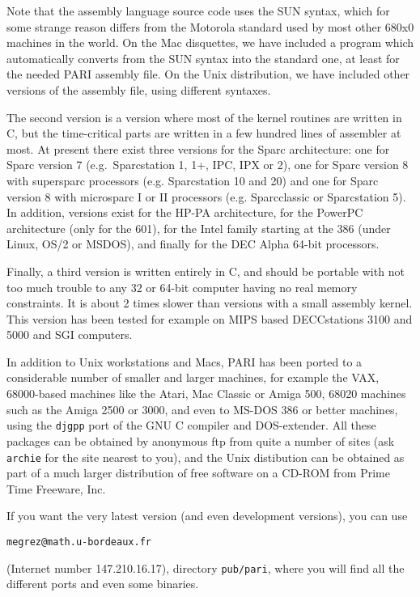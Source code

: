Note that the assembly language source code uses the SUN syntax,
which for some strange reason differs from the Motorola standard used by
most other 680x0 machines in the world. On the Mac disquettes, we have
included a program which automatically converts
from the SUN syntax into the standard one, at least for the needed PARI
assembly file. On the Unix distribution, we have included other versions
of the assembly file, using different syntaxes. 

The second version is a version where most of the kernel routines are written
in C, but the time-critical parts are written in a few hundred lines
of assembler at most. At present there exist three versions for the Sparc 
architecture: one for Sparc version 7 (e.g.~Sparcstation 1, 1+, IPC, IPX or 2),
one for Sparc version 8 with supersparc processors (e.g. Sparcstation 10
and 20) and one for Sparc version 8 with microsparc I or II processors
(e.g. Sparcclassic or Sparcstation 5). In addition, versions exist for
the HP-PA architecture, for the PowerPC architecture (only for the 601),
for the Intel family starting at the 386 (under Linux, OS/2 or MSDOS), and
finally for the DEC Alpha 64-bit processors.

Finally, a third version is written entirely in C, and should be portable with
not too much trouble to any 32 or 64-bit computer having no real memory
constraints. It is about 2 times slower than versions with a small assembly
kernel. This version has been tested for example on MIPS based DECCstations 
3100 and 5000 and SGI computers. 

In addition to Unix workstations and Macs, PARI has been ported to a 
considerable number of smaller and larger machines, for example the VAX,
68000-based machines like the Atari, Mac Classic or Amiga 500, 68020 machines
such as the Amiga 2500 or 3000, and even to MS-DOS 386 or better machines, 
using the {\tt djgpp} port of the GNU C compiler and DOS-extender.
\smallskip
All these packages can be obtained by anonymous ftp from quite a number
of sites (ask {\tt archie} for the site nearest to you), and the Unix
distibution can be obtained as part of a much larger distribution of
free software on a CD-ROM from Prime Time Freeware, Inc.

If you want the very latest version (and even development versions),
you can use 

{\tt megrez@math.u-bordeaux.fr} 

(Internet number 147.210.16.17), directory {\tt pub/pari}, where you
will find all the different ports and even some binaries.

